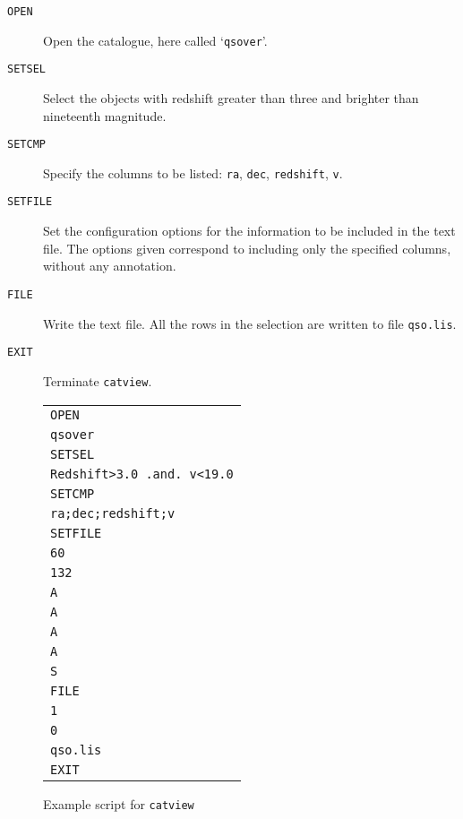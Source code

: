 \documentclass[twoside,11pt]{article}
\renewcommand{\_}{\texttt{\symbol{95}}}
\begin{document}
\begin{description}

  \item[ {\tt OPEN} ] Open the catalogue, here called `{\tt qsover}'.

  \item[ {\tt SETSEL} ] Select the objects with redshift greater than
   three and brighter than nineteenth magnitude.

  \item[ {\tt SETCMP} ] Specify the columns to be listed: {\tt ra},
   {\tt dec}, {\tt redshift}, {\tt v}.

  \item[ {\tt SETFILE} ] Set the configuration options for the 
   information to be included in the text file.  The options given
   correspond to including only the specified columns, without any
   annotation.

  \item[ {\tt FILE} ] Write the text file.  All the rows in the
   selection are written to file {\tt qso.lis}.

  \item[ {\tt EXIT} ] Terminate {\tt catview}.

\end{description}

\begin{figure}[htbp]
\begin{center}

\begin{tabular}{l}
{\tt OPEN}                    \\
{\tt qsover}                  \\
{\tt SETSEL}                  \\
{\tt Redshift>3.0 .and. v<19.0} \\
{\tt SETCMP}                  \\
{\tt ra;dec;redshift;v}       \\
{\tt SETFILE}                 \\
{\tt 60}                      \\
{\tt 132}                     \\
{\tt A}                       \\
{\tt A}                       \\
{\tt A}                       \\
{\tt A}                       \\
{\tt S}                       \\
{\tt FILE}                    \\
{\tt 1}                       \\
{\tt 0}                       \\
{\tt qso.lis}                 \\
{\tt EXIT}                    \\
\end{tabular}

\caption{Example script for {\tt catview}\label{CATVIEW_SCRIPT} }

\end{center}
\end{figure}
\end{document}
